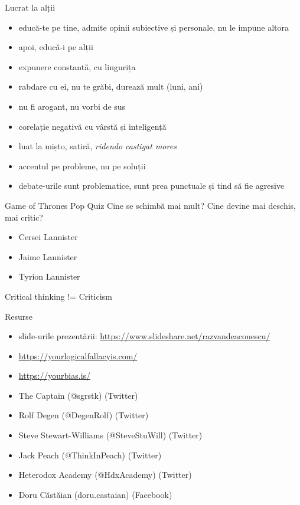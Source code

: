 \documentclass{simple}
\begin{document}
\begin{frame}{Lucrat la alții}
  \begin{itemize}
    \pause
    \item educă-te pe tine, admite opinii subiective și personale, nu le impune altora
    \pause
    \item apoi, educă-i pe alții
    \pause
    \item expunere constantă, cu lingurița
    \pause
    \item rabdare cu ei, nu te grăbi, durează mult (luni, ani)
    \pause
    \item nu fi arogant, nu vorbi de sus
    \pause
    \item corelație negativă cu vârstă și inteligență
    \pause
    \item luat la mișto, satiră, \textit{ridendo castigat mores}
    \pause
    \item accentul pe probleme, nu pe soluții
    \pause
    \item debate-urile sunt problematice, sunt prea punctuale și tind să fie agresive
  \end{itemize}
\end{frame}

\begin{frame}{Game of Thrones Pop Quiz}
  Cine se schimbă mai mult? Cine devine mai deschis, mai critic?
  \begin{itemize}
    \item Cersei Lannister
    \item Jaime Lannister
    \item Tyrion Lannister
  \end{itemize}
\end{frame}

\begin{frame}{}
  \centering
  \Large{Critical thinking != Criticism}
\end{frame}

\begin{frame}{Resurse}
  \begin{itemize}
    \item slide-urile prezentării: \url{https://www.slideshare.net/razvandeaconescu/}
    \item \url{https://yourlogicalfallacyis.com/}
    \item \url{https://yourbias.is/}
    \item The Captain (@sgrstk) (Twitter)
    \item Rolf Degen (@DegenRolf) (Twitter)
    \item Steve Stewart-Williams (@SteveStuWill) (Twitter)
    \item Jack Peach (@ThinkInPeach) (Twitter)
    \item Heterodox Academy (@HdxAcademy) (Twitter)
    \item Doru Căstăian (doru.castaian) (Facebook)
  \end{itemize}
\end{frame}
\end{document}
